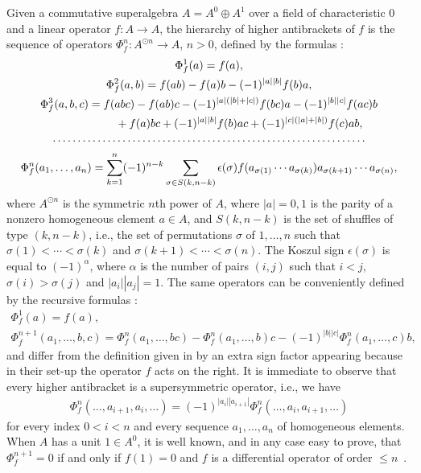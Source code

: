 \documentclass[pdftex]{sigma}
\numberwithin{equation}{section}
\begin{document}
Given a commutative superalgebra $A=A^{0}\oplus A^{1}$ over a f\/ield of characteristic 0 and a linear operator $f\colon A\to A$, the hierarchy of higher antibrackets of $f$ is the sequence of operators $\Phi_f^n\colon A^{\odot n}\to A$, $n>0$, def\/ined by the formulas \cite{koszul85,markl2}:
\begin{gather}
\Phi^1_f(a)= f(a),\nonumber\\
\Phi^2_f(a,b)= f(ab)-f(a)b-(-1)^{|a||b|}f(b)a,\nonumber\\
\Phi^3_f(a,b,c)= f(abc)-f(ab)c-(-1)^{|a|(|b|+|c|)}f(bc)a-(-1)^{|b||c|}f(ac)b\nonumber\\
\hphantom{\Phi^3_f(a,b,c)=}{} +f(a)bc+(-1)^{|a||b|}f(b)ac+(-1)^{|c|(|a|+|b|)} f(c)ab ,\nonumber\\
\cdots\cdots\cdots\cdots\cdots\cdots\cdots\cdots\cdots\cdots\cdots\cdots\cdots\cdots\cdots\cdots\cdots\cdots\cdots\cdots\cdots\nonumber\\
\Phi^n_f(a_1,\ldots,a_n)= \sum_{k=1}^n(-1)^{n-k}\sum_{\sigma\in S(k,n-k)}\epsilon(\sigma)
f(a_{\sigma(1)}\cdots a_{\sigma(k)})a_{\sigma(k+1)}\cdots a_{\sigma(n)} ,\label{equ.defiKoszul}
\end{gather}
where $A^{\odot n}$ is the symmetric $n$th power of $A$, where $|a|=0,1$ is the parity of a nonzero homogeneous element $a\in A$, and
$S(k,n-k)$ is the set of shuf\/f\/les of type $(k,n-k)$, i.e., the set of permutations $\sigma$ of $1,\ldots,n$
such that $\sigma(1)<\cdots<\sigma(k)$ and $\sigma(k+1)<\cdots<\sigma(n)$. The Koszul sign
$\epsilon(\sigma)$ is equal to $(-1)^{\alpha}$, where $\alpha$ is the number of pairs $(i,j)$ such that
$i<j$, $\sigma(i)>\sigma(j)$ and $|a_i||a_j|=1$. The same operators can be conveniently def\/ined by the recursive formulas \cite{akman}:
\begin{gather}
\Phi^1_f(a)=f(a),\nonumber\\
\Phi^{n+1}_f(a_1,\ldots,b,c) = \Phi^{n}_f(a_1,\ldots,bc)-\Phi^{n}_f(a_1,\ldots,b)c-(-1)^{|b||c|}\Phi^{n}_f(a_1,\ldots,c)b,\label{equ.defiakman}
\end{gather}
and dif\/fer from the def\/inition given in \cite{alfaro,BDA} by an extra sign factor appearing because in their set-up the operator $f$ acts on the right.
It is immediate to observe that every higher antibracket is a supersymmetric operator, i.e., we have
\begin{gather*} \Phi_f^n(\ldots,a_{i+1},a_i,\ldots)=(-1)^{|a_i| |a_{i+1}|}\Phi_f^n(\ldots,a_{i},a_{i+1},\ldots)\end{gather*}
for every index $0<i<n$ and every sequence $a_1,\ldots,a_n$ of homogeneous elements.
When $A$ has a unit $1\in A^0$, it is well known, and in any case easy to prove, that $\Phi^{n+1}_f=0$
if and only if $f(1)=0$ and $f$ is a dif\/ferential operator of order $\le n$~\cite{koszul85}.
\end{document}
